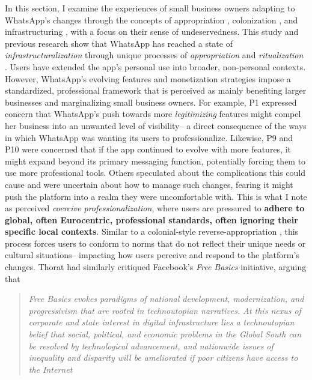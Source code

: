 In this section, I examine the experiences of small business owners adapting to WhatsApp's changes through the concepts of appropriation \cite{10.1145/3613904.3642590}, colonization \cite{doi:10.1177/1527476419831640}, and infrastructuring \cite{doi:10.1177/00027649921955326}, with a focus on their sense of undeservedness. This study and previous research show that WhatsApp has reached a state of \textit{infrastructuralization} through unique processes of \textit{appropriation} \cite{10.1145/3613905.3651034} and \textit{ritualization} \cite{doi:10.1177/01968599221095177}. Users have extended the app’s personal use into broader, non-personal contexts. However, WhatsApp’s evolving features and monetization strategies impose a standardized, professional framework that is perceived as mainly benefiting larger businesses and marginalizing small business owners. For example, P1 expressed concern that WhatsApp’s push towards more \textit{legitimizing} features might compel her business into an unwanted level of visibility-- a direct consequence of the ways in which WhatsApp was wanting its users to professionalize. Likewise, P9 and P10 were concerned that if the app continued to evolve with more features, it might expand beyond its primary messaging function, potentially forcing them to use more professional tools. Others speculated about the complications this could cause and were uncertain about how to manage such changes, fearing it might push the platform into a realm they were uncomfortable with. This is what I note as perceived \textit{coercive professionalization}, where users are pressured to \textbf{adhere to global, often Eurocentric, professional standards, often ignoring their specific local contexts}. Similar to a colonial-style reverse-appropriation \cite{10.1145/3613904.3642590}, this process forces users to conform to norms that do not reflect their unique needs or cultural situations-- impacting how users perceive and respond to the platform’s changes. Thorat \cite{Thorat2020} had similarly critiqued Facebook's \textit{Free Basics} initiative, arguing that

\begin{quote}
    \textit{Free Basics evokes paradigms of national development, modernization, and progressivism that are rooted in technoutopian narratives. At this nexus of corporate and state interest in digital infrastructure lies a technoutopian belief that social, political, and economic problems in the Global South can be resolved by technological advancement, and nationwide issues of inequality and disparity will be ameliorated if poor citizens have access to the Internet} 
\end{quote}

